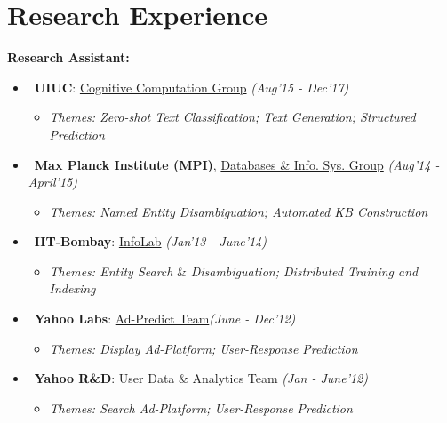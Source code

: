 \section{\mysidestyle Research Experience} 
\vspace{0mm}
\textsf{\textbf{Research Assistant:}}
\begin{itemize}[leftmargin = 0.7cm]\compresslist
\item~\textbf{UIUC}: \href{http://cogcomp.org/}{Cognitive Computation Group} \hfill{\small\textit{(Aug'15 - Dec'17)}} \vspace{-1mm}
\begin{itemize}[leftmargin=*]\compresslist
        \item[]\small\textit{Themes: Zero-shot Text Classification; Text Generation; Structured Prediction}
    \end{itemize}

\item~\textbf{Max Planck Institute (MPI)}, \href{https://www.mpi-inf.mpg.de/departments/databases-and-information-systems/}{Databases \& Info. Sys. Group}  \hfill{\small\textit{(Aug'14 - April'15)}}
\vspace{-1mm}
\begin{itemize}[leftmargin=*]\compresslist
        \item[]\small\textit{Themes: Named Entity Disambiguation; Automated KB Construction}
    \end{itemize}

\item~\textbf{IIT-Bombay}: \href{http://www.cse.iitb.ac.in/infolab}{InfoLab} \hfill{\small\textit{(Jan'13 - June'14)}}
\vspace{-1mm}
\begin{itemize}[leftmargin=*]\compresslist
        \item[]\small\textit{Themes: Entity Search} \&\textit{ Disambiguation; Distributed Training and Indexing}
    \end{itemize}
\item~\textbf{Yahoo Labs}: \href{https://research.yahoo.com/research-areas/advertising-science}{Ad-Predict Team}\hfill{\small\textit{(June - Dec'12)}}
\vspace{-1mm}
\begin{itemize}[leftmargin=*]\compresslist
        \item[]\small\textit{Themes: Display Ad-Platform; User-Response Prediction}
    \end{itemize}
\item~\textbf{Yahoo R\&D}: User Data \& Analytics Team \hfill{\small\textit{(Jan - June'12)}}
\vspace{-1mm}
\begin{itemize}[leftmargin=*]\compresslist
        \item[]\small\textit{Themes: Search Ad-Platform; User-Response Prediction}
    \end{itemize}
\end{itemize}